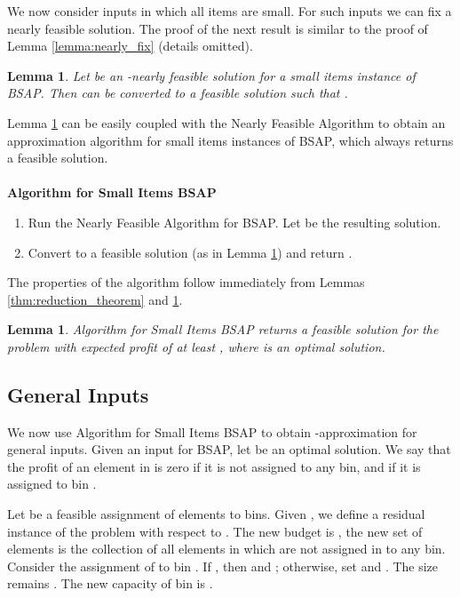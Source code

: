 \documentclass[11pt]{article}
\newtheorem{lemma}[theorem]{Lemma}
\begin{document}
{We now consider inputs in which all items are small. For such inputs we can
 fix a nearly feasible solution. The proof of the next result is similar to the proof of
Lemma \ref{lemma:nearly_fix} (details omitted).


\begin{lemma}
\label{lemma:nearly_fix_bsap}
Let  be an -nearly feasible solution
for a small items instance of BSAP. Then  can be converted to a feasible
solution  such that .
\end{lemma}

Lemma \ref{lemma:nearly_fix_bsap} can be easily coupled with the Nearly Feasible Algorithm
to obtain an approximation algorithm for small items instances of BSAP, which always returns a feasible
solution.
\\
\\
\noindent
{\bf Algorithm for Small Items BSAP}
\begin{enumerate}
\item Run the Nearly Feasible Algorithm for BSAP. Let  be the resulting solution.
\item Convert  to a feasible solution  (as in
Lemma \ref{lemma:nearly_fix_bsap}) and return .
\end{enumerate}
The properties of the algorithm follow immediately from Lemmas \ref{thm:reduction_theorem}
 and \ref{lemma:nearly_fix_bsap}.

\begin{lemma}
Algorithm for Small Items BSAP returns a feasible solution for the
 problem with expected profit of at least , where
 is an optimal solution.
\end{lemma}

\subsection{General Inputs}
We now use Algorithm for Small Items BSAP to obtain -approximation for general inputs. Given an input for BSAP, let  be an optimal solution. We say that the profit of an element  in  is zero if it is not assigned to any bin, and
 if it is assigned to bin .

Let  be a feasible assignment of elements to bins. Given , we define a residual instance of the problem with
respect to . The new budget is , the new set of elements  is the collection of all elements in  which are not
assigned in  to any bin. Consider the assignment of   to bin .
 If  , then  and
; otherwise, set  and .
 The size remains . The new capacity of bin 
is .

}
\end{document}
